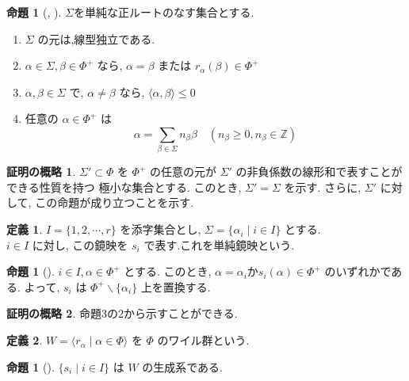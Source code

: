 \documentclass[
  a4paper, 
  12pt,
  ja=standard,
  xelatex,
  left=30truemm,
  right=30truemm,
  titlepage 
]{bxjsarticle}
\theoremstyle{definition}
\newtheorem{df}{定義}
\newtheorem{prop}[thm]{命題}
\newtheorem*{prf}{証明の概略}
\begin{document}
\begin{prop} [{\cite[命題2.1]{b1}}, {\cite[命題20.1]{b2}}] 
  $\Sigma$を単純な正ルートのなす集合とする.
  \begin{enumerate} 
    \item $\Sigma$ の元は,線型独立である.
    \item $\alpha \in \Sigma, \beta \in \Phi^{+}$ なら, $\alpha = \beta$ または $r_{\alpha}(\beta) \in \Phi^{+}$
    \item $\alpha, \beta \in \Sigma $ で, $\alpha \neq \beta $ なら, $ \langle \alpha, \beta \rangle \leq 0 $
    \item 任意の $\alpha \in \Phi^{+}$ は
    $$ \alpha = \sum_{ \beta \in \Sigma} n_{\beta} \beta \quad (n_{\beta} \geq 0, n_{\beta} \in \mathbb{Z}) $$
  \end{enumerate}
\end{prop}

\begin{prf}
  $\Sigma ' \subset \Phi$ を $\Phi^{+}$ の任意の元が $\Sigma '$ の非負係数の線形和で表すことができる性質を持つ
  極小な集合とする. このとき, $\Sigma ' = \Sigma$ を示す. さらに, $\Sigma '$ に対して, この命題が成り立つことを示す.
\end{prf}

\begin{df} 
  $I = \{ 1, 2, \cdots, r \}$ を添字集合とし, $\Sigma = \{ \alpha_i \mid i \in I \}$ とする. \\
  $ i \in I $ に対し, この鏡映を $s_i$ で表す.これを単純鏡映という.
\end{df}

\begin{prop} [{\cite[命題2.2]{b1}}]
  $ i \in I, \alpha \in \Phi^{+}$ とする. このとき,
  $\alpha = \alpha_i$か$s_i(\alpha) \in \Phi^{+}$ のいずれかである. 
  よって, $s_i$ は $\Phi^{+} \backslash \{ \alpha_i\}$ 上を置換する.
\end{prop}

\begin{prf}
  命題3の2から示すことができる.
\end{prf}

\begin{df}
  $W = \langle r_\alpha \mid \alpha \in \Phi \rangle $ を $\Phi$ のワイル群という.
\end{df}

\begin{prop} [{\cite[命題2.3]{b1}}]
  $\{ s_i \mid i \in I \}$ は $W$ の生成系である. 
\end{prop}
\end{document}
